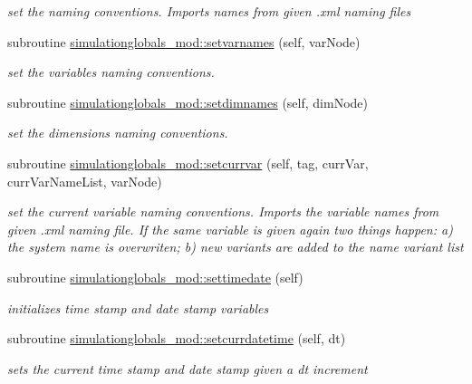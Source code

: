 \begin{DoxyCompactItemize}
\begin{DoxyCompactList}\small\item\em set the naming conventions. Imports names from given .xml naming files \end{DoxyCompactList}\item 
subroutine \mbox{\hyperlink{namespacesimulationglobals__mod_a2c6fa0a9123d06b2110258ea200f4f52}{simulationglobals\+\_\+mod\+::setvarnames}} (self, var\+Node)
\begin{DoxyCompactList}\small\item\em set the variables naming conventions. \end{DoxyCompactList}\item 
subroutine \mbox{\hyperlink{namespacesimulationglobals__mod_a878fdcfa67037a1bc8411995394c2bef}{simulationglobals\+\_\+mod\+::setdimnames}} (self, dim\+Node)
\begin{DoxyCompactList}\small\item\em set the dimensions naming conventions. \end{DoxyCompactList}\item 
subroutine \mbox{\hyperlink{namespacesimulationglobals__mod_a4dd64cb7a896b62d90e20a7eab65a6bf}{simulationglobals\+\_\+mod\+::setcurrvar}} (self, tag, curr\+Var, curr\+Var\+Name\+List, var\+Node)
\begin{DoxyCompactList}\small\item\em set the current variable naming conventions. Imports the variable names from given .xml naming file. If the same variable is given again two things happen\+: a) the system name is overwriten; b) new variants are added to the name variant list \end{DoxyCompactList}\item 
subroutine \mbox{\hyperlink{namespacesimulationglobals__mod_aefda4344f03a705055ad6cb97cb90c65}{simulationglobals\+\_\+mod\+::settimedate}} (self)
\begin{DoxyCompactList}\small\item\em initializes time stamp and date stamp variables \end{DoxyCompactList}\item 
subroutine \mbox{\hyperlink{namespacesimulationglobals__mod_acbb28eee5547a03dc28c924d8e23ad9a}{simulationglobals\+\_\+mod\+::setcurrdatetime}} (self, dt)
\begin{DoxyCompactList}\small\item\em sets the current time stamp and date stamp given a dt increment \end{DoxyCompactList}\item 

\end{DoxyCompactItemize}
